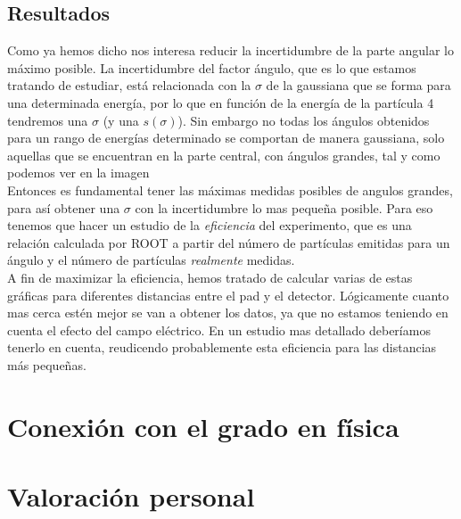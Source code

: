 \documentclass[12pt,a4paper]{article}
\numberwithin{equation}{section}
\numberwithin{figure}{section}
\begin{document}

\subsection{Resultados}

Como ya hemos dicho nos interesa reducir la incertidumbre de la parte angular lo máximo posible. La incertidumbre del factor ángulo, que es lo que estamos tratando de estudiar, está relacionada con la $\sigma$ de la gaussiana que se forma para una determinada energía, por lo que en función de la energía de la partícula 4 tendremos una $\sigma$ (y una $s(\sigma)$). Sin embargo no todas los ángulos obtenidos para un rango de energías determinado se comportan de manera gaussiana, solo aquellas que se encuentran en la parte central, con ángulos grandes, tal y como podemos ver en la imagen \\


Entonces es fundamental tener las máximas medidas posibles de angulos grandes, para así obtener una $\sigma$ con la incertidumbre lo mas pequeña posible. Para eso tenemos que hacer un estudio de la {\it eficiencia} del experimento, que es una relación calculada por ROOT a partir del número de partículas emitidas para un ángulo y el número de partículas {\it realmente} medidas. \\

A fin de maximizar la eficiencia, hemos tratado de calcular varias de estas gráficas para diferentes distancias entre el pad y el detector. Lógicamente cuanto mas cerca estén mejor se van a obtener los datos, ya que no estamos teniendo en cuenta el efecto del campo eléctrico. En un estudio mas detallado deberíamos tenerlo en cuenta, reudicendo probablemente esta eficiencia para las distancias más pequeñas. 



\section{Conexión con el grado en física}

\section{Valoración personal}
\end{document}
